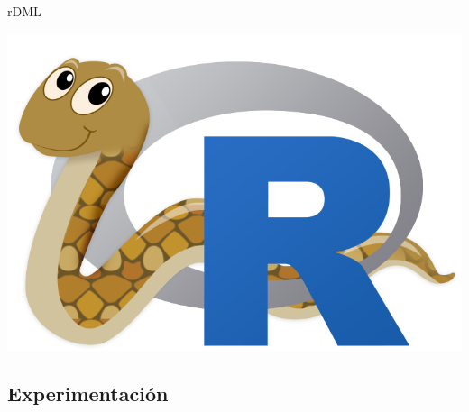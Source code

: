 \documentclass[10pt, compress]{beamer}
\begin{document}
\begin{frame}{rDML}
\begin{center}
    \hspace{0.1\textwidth}
    \includegraphics[height=0.1\textheight]{images/reticulated_python.png}
  \end{center}
\end{frame}


\subsection{Experimentación}
\end{document}
